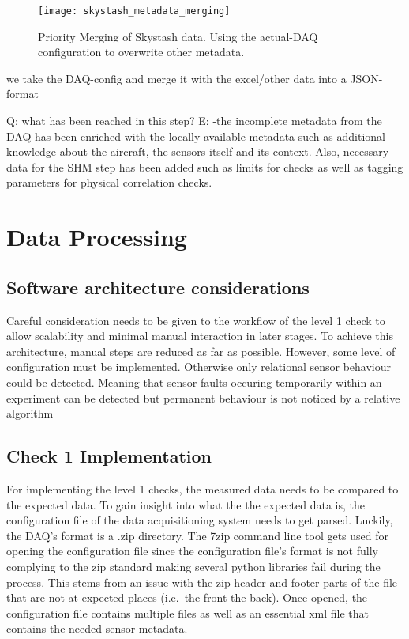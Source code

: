 \begin{figure}
    \centering
    \texttt{[image: skystash\_metadata\_merging]}
    \caption{Priority Merging of Skystash data. Using the actual-DAQ configuration to overwrite other metadata.}
    \label{fig:skystash_metadata_merging}
\end{figure}





we take the DAQ-config and merge it with the excel/other data into a JSON-format

Q: what has been reached in this step?
E: -the incomplete metadata from the DAQ has been enriched with the locally available metadata such as additional knowledge about the aircraft, the sensors itself and its context. Also, necessary data for the SHM step has been added such as limits for checks as well as tagging parameters for physical correlation checks.


\section{Data Processing}

\subsection{Software architecture considerations}

Careful consideration needs to be given to the workflow of the level 1 check to allow scalability and minimal manual interaction in later stages. To achieve this architecture, manual steps are reduced as far as possible. However, some level of configuration must be implemented. Otherwise only relational sensor behaviour could be detected. Meaning that sensor faults occuring temporarily within an experiment can be detected but permanent behaviour is not noticed by a relative algorithm

\subsection{Check 1 Implementation}
For implementing the level 1 checks, the measured data needs to be compared to the expected data. To gain insight into what the the expected data is, the configuration file of the data acquisitioning system needs to get parsed.
Luckily, the DAQ's format is a .zip directory.
The 7zip command line tool gets used for opening the configuration file since the configuration file's format is not fully complying to the zip standard making several python libraries fail during the process. This stems from an issue with the zip header and footer parts of the file that are not at expected places (i.e.\ the front the back).
Once opened, the configuration file contains multiple files as well as an essential xml file that contains the needed sensor metadata.

